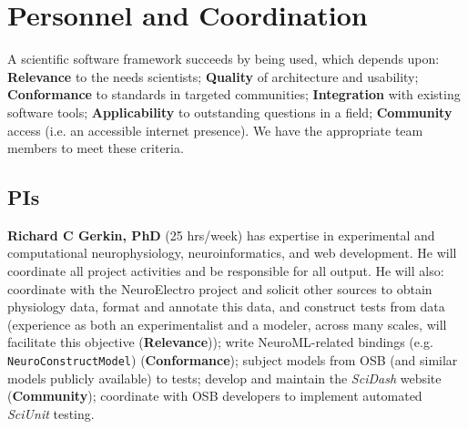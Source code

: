 \documentclass[11pt,letterpaper]{article}
\let\verbx\lstinline
\begin{document}


\section{Personnel and Coordination}
\renewcommand{\theenumi}{\alph{enumi}}
A scientific software framework succeeds by being used, which depends upon: 
\textbf{Relevance} to the needs scientists; 
\textbf{Quality} of architecture and usability; 
\textbf{Conformance} to standards in targeted communities; 
\textbf{Integration} with existing software tools; 
\textbf{Applicability} to outstanding questions in a field; 
\textbf{Community} access (i.e. an accessible internet presence). 
We have the appropriate team members to meet these criteria. 

\subsection{PIs}

\textbf{Richard C Gerkin, PhD} (25 hrs/week) has expertise in experimental and computational neurophysiology, neuroinformatics, and web development.  He will coordinate all project activities and be responsible for all output. He will also: coordinate with the NeuroElectro project and solicit other sources to obtain physiology data, format and annotate this data, and construct tests from data (experience as both an experimentalist and a modeler, across many scales, will facilitate this objective (\textbf{Relevance})); write NeuroML-related bindings (e.g. \verbx{NeuroConstructModel}) (\textbf{Conformance}); subject models from OSB (and similar models publicly available) to tests; develop and maintain the \textit{SciDash} website (\textbf{Community}); coordinate with OSB developers to implement automated \textit{SciUnit} testing.
\end{document}
